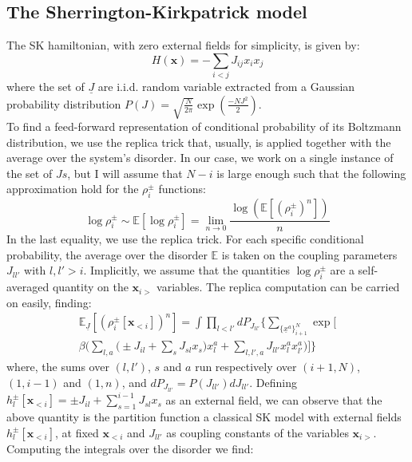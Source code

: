\documentclass[aps,physrev,10pt,floatfix,reprint]{revtex4-2}
\begin{document}
\subsection{The Sherrington-Kirkpatrick model}
The SK hamiltonian, with zero external fields for simplicity, is given by:
\begin{equation}
H\left(\mathbf{x}\right)=-\sum_{i<j}J_{ij}x_{i}x_{j}
\end{equation}
where the set of $\underline{J}$ are i.i.d. random variable extracted from a Gaussian probability distribution $P(J)=\sqrt{\frac{N}{2\pi}}\exp\left(\frac{-NJ^2}{2} \right)$. \\
To find a feed-forward representation of conditional probability of its Boltzmann distribution, we use the replica trick \cite{10.1142/0271} that, usually, is applied together with the average over the system's disorder. In our case, we work on a single instance of the set of $Js$, but I will assume that $N-i$ is large enough such that the following approximation hold for the $\rho_i^{\pm}$ functions: 
\[
\log\rho_i^{\pm} \sim \mathbb{E}\left[  \log\rho_i^{\pm} \right] = \lim_{n\rightarrow 0} \frac{  \log(\mathbb{E}\left[(\rho_i^{\pm})^n \right])}{n}
\]
In the last equality, we use the replica trick. 
For each specific conditional probability, the average over the disorder $\mathbb{E}$ is taken on the coupling parameters $J_{ll'}$ with $l,l'>i$. Implicitly, we assume that the quantities $\log\rho_i^{\pm}$ are a self-averaged quantity on the $\mathbf{x}_{i>}$ variables.
 The replica computation can be carried on easily, finding:
\begin{multline}
\mathbb{E}_{\underline{J}}\left[(\rho_i^{\pm}[\mathbf{x}_{<i}])^n \right]  = 
\int \prod_{l<l'} dP_{J_{ll'}} \bigg\{ 
\sum_{\{\underline{x}^{a}\}_{i+1}^N} \exp\bigg[\\ \beta \bigg( 
\sum_{l,a}\bigg( \pm J_{il}  
+ \sum_{s} J_{sl} x_s \bigg) x_l^{a} + 
\sum_{l,l', a} J_{ll'} x_l^{a} x_{l'}^{a}
\bigg)  \bigg] 
\bigg\}
\end{multline}
where, the sums over $(l,l')$, $s$ and $a$ run respectively over $(i+1,N)$, $(1,i-1)$ and $(1,n)$, and $dP_{J_{ll'}}=P(J_{ll'})dJ_{ll'}$. Defining $h_l^{\pm}[\mathbf{x}_{<i}] =\pm J_{il} + \sum_{s=1}^{i-1} J_{sl} x_s$ as an external field, we can observe that the above quantity is the partition function a classical SK model with external fields $h_l^{\pm}[\mathbf{x}_{<i}]$, at fixed $\mathbf{x}_{<i}$ and $J_{ll'}$ as coupling constants of the variables $\mathbf{x}_{i>}$.  
Computing the integrals over the disorder we find: 
\end{document}
